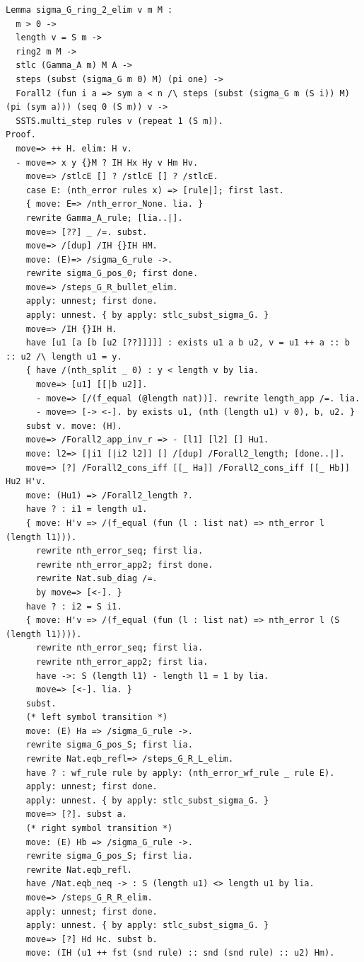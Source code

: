 \begin{lstlisting}
Lemma sigma_G_ring_2_elim v m M :
  m > 0 ->
  length v = S m ->
  ring2 m M ->
  stlc (Gamma_A m) M A ->
  steps (subst (sigma_G m 0) M) (pi one) ->
  Forall2 (fun i a => sym a < n /\ steps (subst (sigma_G m (S i)) M) (pi (sym a))) (seq 0 (S m)) v ->
  SSTS.multi_step rules v (repeat 1 (S m)).
Proof.
  move=> ++ H. elim: H v.
  - move=> x y {}M ? IH Hx Hy v Hm Hv.
    move=> /stlcE [] ? /stlcE [] ? /stlcE.
    case E: (nth_error rules x) => [rule|]; first last.
    { move: E=> /nth_error_None. lia. }
    rewrite Gamma_A_rule; [lia..|].
    move=> [??] _ /=. subst.
    move=> /[dup] /IH {}IH HM.
    move: (E)=> /sigma_G_rule ->.
    rewrite sigma_G_pos_0; first done.
    move=> /steps_G_R_bullet_elim.
    apply: unnest; first done.
    apply: unnest. { by apply: stlc_subst_sigma_G. }
    move=> /IH {}IH H.
    have [u1 [a [b [u2 [??]]]]] : exists u1 a b u2, v = u1 ++ a :: b :: u2 /\ length u1 = y.
    { have /(nth_split _ 0) : y < length v by lia.
      move=> [u1] [[|b u2]].
      - move=> [/(f_equal (@length nat))]. rewrite length_app /=. lia.
      - move=> [-> <-]. by exists u1, (nth (length u1) v 0), b, u2. }
    subst v. move: (H). 
    move=> /Forall2_app_inv_r => - [l1] [l2] [] Hu1.
    move: l2=> [|i1 [|i2 l2]] [] /[dup] /Forall2_length; [done..|].
    move=> [?] /Forall2_cons_iff [[_ Ha]] /Forall2_cons_iff [[_ Hb]] Hu2 H'v.
    move: (Hu1) => /Forall2_length ?.
    have ? : i1 = length u1.
    { move: H'v => /(f_equal (fun (l : list nat) => nth_error l (length l1))).
      rewrite nth_error_seq; first lia.
      rewrite nth_error_app2; first done.
      rewrite Nat.sub_diag /=.
      by move=> [<-]. }
    have ? : i2 = S i1.
    { move: H'v => /(f_equal (fun (l : list nat) => nth_error l (S (length l1)))).
      rewrite nth_error_seq; first lia.
      rewrite nth_error_app2; first lia.
      have ->: S (length l1) - length l1 = 1 by lia.
      move=> [<-]. lia. }
    subst.
    (* left symbol transition *)
    move: (E) Ha => /sigma_G_rule ->.
    rewrite sigma_G_pos_S; first lia.
    rewrite Nat.eqb_refl=> /steps_G_R_L_elim.
    have ? : wf_rule rule by apply: (nth_error_wf_rule _ rule E).
    apply: unnest; first done.
    apply: unnest. { by apply: stlc_subst_sigma_G. }
    move=> [?]. subst a.
    (* right symbol transition *)
    move: (E) Hb => /sigma_G_rule ->.
    rewrite sigma_G_pos_S; first lia.
    rewrite Nat.eqb_refl.
    have /Nat.eqb_neq -> : S (length u1) <> length u1 by lia.
    move=> /steps_G_R_R_elim.
    apply: unnest; first done.
    apply: unnest. { by apply: stlc_subst_sigma_G. }
    move=> [?] Hd Hc. subst b.
    move: (IH (u1 ++ fst (snd rule) :: snd (snd rule) :: u2) Hm).

\end{lstlisting}
